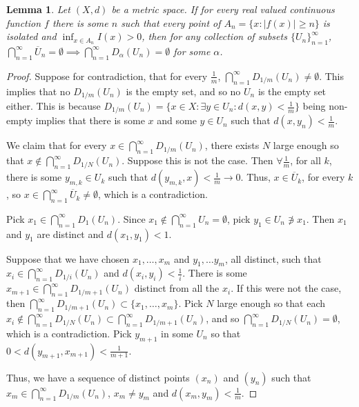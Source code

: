 \documentclass[openany, amssymb, psamsfonts]{amsart}
\newtheorem{lem}{Lemma}[section]
\theoremstyle{definition}
\numberwithin{equation}{section}
\begin{document}
\begin{lem}\label{lem:5.4}
  Let $(X,d)$ be a metric space. If for every real valued continuous function $f$ there is some $n$ such that every point of $A_n = \{x : |f(x)| \ge n\}$ is isolated and $\inf_{x\in A_n} I(x) > 0$, then for any collection of subsets $\{U_n\}_{n=1}^\infty$, $\bigcap_{n=1}^\infty \overline{U}_n = \emptyset \implies \bigcap_{n=1}^\infty D_\alpha(U_n) = \emptyset$ for some $\alpha$.
\end{lem}
\begin{proof}
  Suppose for contradiction, that for every $\frac1{m}$, $\bigcap_{n=1}^\infty D_{1/m}(U_n) \neq \emptyset$. This implies that no $D_{1/m}(U_n)$ is the empty set, and so no $U_n$ is the empty set either. This is because $D_{1/m}(U_n) = \{x \in X : \exists y \in U_n : d(x,y) < \frac1{m}\}$ being non-empty implies that there is some $x$ and some $y\in U_n$ such that $d(x,y_n)< \frac1{m}$. 

  We claim that for every $x \in \bigcap_{n=1}^\infty D_{1/m}(U_n)$, there exists $N$ large enough so that $x \not \in  \bigcap_{n=1}^\infty D_{1/N}(U_n)$. Suppose this is not the case. Then $\forall \frac1{m}$, for all $k$, there is some $y_{m,k} \in U_k$ such that $d(y_{m,k}, x) < \frac1{m}\to 0$. Thus, $x \in \overline{U}_k$, for every $k$, so $x\in \bigcap_{n=1}^\infty \overline{U}_k \neq \emptyset$, which is a contradiction.

  Pick $x_1 \in \bigcap_{n=1}^\infty D_{1}(U_n)$. Since $x_1 \not\in \bigcap_{n=1}^\infty U_n = \emptyset$, pick $y_1 \in U_n \not\ni x_1$. Then $x_1$ and $y_1$ are distinct and $d(x_1, y_1) < 1$. 

  Suppose that we have chosen $x_1, \ldots, x_m$ and $y_1, \ldots y_m$, all distinct, such that $x_i \in \bigcap_{n=1}^\infty D_{1/i}(U_n)$ and $d(x_i, y_i) < \frac1{i}$. There is some $x_{m+1} \in \bigcap_{n=1}^\infty D_{1/m+1}(U_n)$ distinct from all the $x_i$. If this were not the case, then $\bigcap_{n=1}^\infty D_{1/m+1}(U_n) \subset \{x_1, \ldots, x_m\}$. Pick $N$ large enough so that each $x_i \not \in \bigcap_{n=1}^\infty D_{1/N}(U_n)\subset\bigcap_{n=1}^\infty D_{1/m+1}(U_n)$, and so $\bigcap_{n=1}^\infty D_{1/N}(U_n) = \emptyset$, which is a contradiction. Pick $y_{m+1}$ in some $U_n$ so that $0 < d(y_{m+1}, x_{m+1}) < \frac1{m+1}$.

  Thus, we have a sequence of distinct points $(x_n)$ and $(y_n)$ such that $x_m \in  \bigcap_{n=1}^\infty D_{1/m}(U_n)$, $x_m \neq y_m$ and $d(x_m, y_m) < \frac1{m}$. 


\end{proof}
\end{document}
